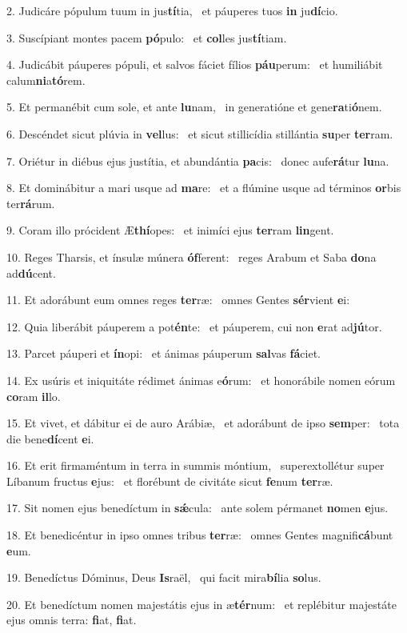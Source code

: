 2. Judicáre pópulum tuum in jus\textbf{tí}tia, \ast\  et páuperes tuos \textbf{in} ju\textbf{dí}cio.\

3. Suscípiant montes pacem \textbf{pó}pulo: \ast\  et \textbf{col}les jus\textbf{tí}tiam.\

4. Judicábit páuperes pópuli, et salvos fáciet fílios \textbf{páu}perum: \ast\  et humiliábit calum\textbf{ni}a\textbf{tó}rem.\

5. Et permanébit cum sole, et ante \textbf{lu}nam, \ast\  in generatióne et gene\textbf{ra}ti\textbf{ó}nem.\

6. Descéndet sicut plúvia in \textbf{vel}lus: \ast\  et sicut stillicídia stillántia \textbf{su}per \textbf{ter}ram.\

7. Oriétur in diébus ejus justítia, et abundántia \textbf{pa}cis: \ast\  donec aufe\textbf{rá}tur \textbf{lu}na.\

8. Et dominábitur a mari usque ad \textbf{ma}re: \ast\  et a flúmine usque ad términos \textbf{or}bis ter\textbf{rá}rum.\

9. Coram illo prócident Æ\textbf{thí}opes: \ast\  et inimíci ejus \textbf{ter}ram \textbf{lin}gent.\

10. Reges Tharsis, et ínsulæ múnera \textbf{óf}ferent: \ast\  reges Arabum et Saba \textbf{do}na ad\textbf{dú}cent.\

11. Et adorábunt eum omnes reges \textbf{ter}ræ: \ast\  omnes Gentes \textbf{sér}vient \textbf{e}i:\

12. Quia liberábit páuperem a pot\textbf{én}te: \ast\  et páuperem, cui non \textbf{e}rat ad\textbf{jú}tor.\

13. Parcet páuperi et \textbf{ín}opi: \ast\  et ánimas páuperum \textbf{sal}vas \textbf{fá}ciet.\

14. Ex usúris et iniquitáte rédimet ánimas e\textbf{ó}rum: \ast\  et honorábile nomen eórum \textbf{co}ram \textbf{il}lo.\

15. Et vivet, et dábitur ei de auro Arábiæ, \dag\  et adorábunt de ipso \textbf{sem}per: \ast\  tota die bene\textbf{dí}cent \textbf{e}i.\

16. Et erit firmaméntum in terra in summis móntium, \dag\  superextollétur super Líbanum fructus \textbf{e}jus: \ast\  et florébunt de civitáte sicut \textbf{fe}num \textbf{ter}ræ.\

17. Sit nomen ejus benedíctum in \textbf{sǽ}cula: \ast\  ante solem pérmanet \textbf{no}men \textbf{e}jus.\

18. Et benedicéntur in ipso omnes tribus \textbf{ter}ræ: \ast\  omnes Gentes magnifi\textbf{cá}bunt \textbf{e}um.\

19. Benedíctus Dóminus, Deus \textbf{Is}raël, \ast\  qui facit mira\textbf{bí}lia \textbf{so}lus.\

20. Et benedíctum nomen majestátis ejus in æ\textbf{tér}num: \ast\  et replébitur majestáte ejus omnis terra: \textbf{fi}at, \textbf{fi}at.\

